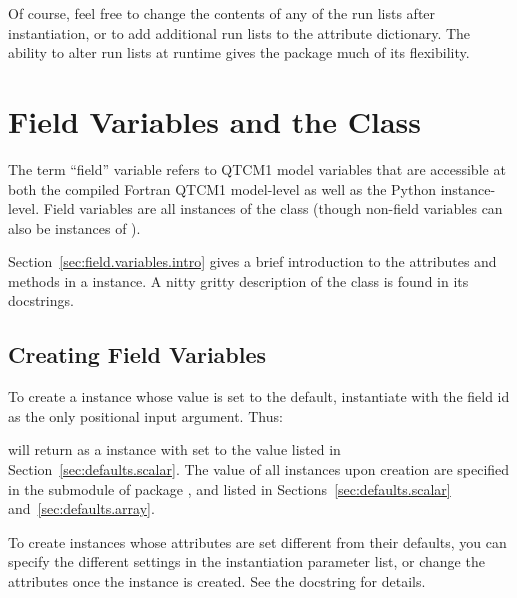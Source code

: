 Of course, feel free to change the contents of any of the run lists
after instantiation, or to add additional run lists to the
 attribute dictionary.  The ability to alter run
lists at runtime gives the  package much of its flexibility.




\section{Field Variables and the  Class}
						\label{sec:field.variables}

The term ``field'' variable refers to QTCM1 model variables that 
are accessible at both the compiled Fortran QTCM1 model-level as
well as the Python  instance-level.
Field variables are all instances of the  class
(though non-field variables can also be instances of ).

Section~\ref{sec:field.variables.intro} gives a brief introduction to
the attributes and methods in a  instance.
A nitty gritty description of the class is found in its docstrings.

	\subsection{Creating Field Variables}

To create a  instance whose value is set to the
default, instantiate with the field id as the only positional
input argument.  Thus:

\begin{codeblock}
\end{codeblock}

will return  as a  instance with 
set to the value listed in Section~\ref{sec:defaults.scalar}.
The value of all  instances upon creation are specified
in the  submodule of package , and listed
in Sections~\ref{sec:defaults.scalar} and~\ref{sec:defaults.array}.

To create  instances whose attributes are set different
from their defaults, you can specify the different settings in the
instantiation parameter list, or change the attributes once the
instance is created.  See the  docstring for details.


